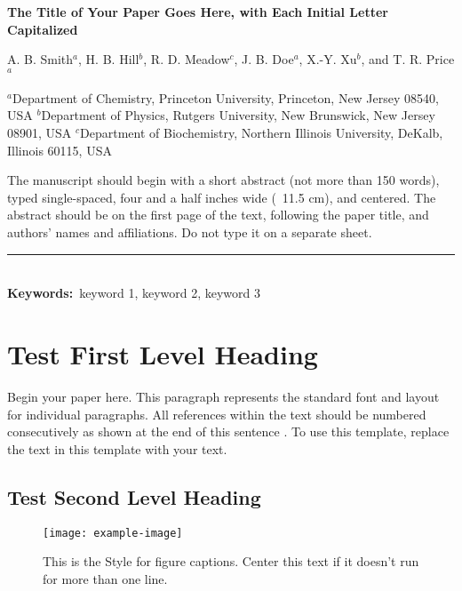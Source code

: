 \documentclass[twoside,onecolumn,12pt]{article}
\newcommand\keywords{%
\noindent\rule{\wd\keywbox}{0.25pt}\\\textbf{Keywords:}\ }
\begin{document}
\begin{center}
\textbf{The Title of Your Paper Goes Here, with Each Initial Letter Capitalized}
\end{center}%
\begin{center}
A. B. Smith\textit{$^{a}$}, H. B. Hill\textit{$^{b}$}, R. D. Meadow\textit{$^{c}$}, J. B. Doe\textit{$^{a}$}, X.-Y. Xu\textit{$^{b}$}, and T. R. Price\textit{$^{a}$} %
\end{center}
\begin{center}
\small\textit{$^{a}$}Department of Chemistry, Princeton University, Princeton, New Jersey 08540, USA \newline
\small\textit{$^{b}$}Department of Physics, Rutgers University, New Brunswick, New Jersey 08901, USA \newline
\small\textit{$^{c}$}Department of Biochemistry, Northern Illinois University, DeKalb, Illinois 60115, USA
\end{center}

\begin{center}
\parbox{11.5cm}{The manuscript should begin with a short abstract (not more than 150 words), typed single-spaced, four and a half inches wide (~11.5 cm), and centered. The abstract should be on the first page of the text, following the paper title, and authors’ names and affiliations. Do not type it on a separate sheet.}
\end{center}
\keywords keyword 1, keyword 2, keyword 3

\section{Test First Level Heading} %
\noindent Begin your paper here. This paragraph represents the standard font and layout for individual paragraphs. All references within the text should be numbered consecutively as shown at the end of this sentence \autocite{andrews1991}. To use this template, replace the text in this template with your text. 

\subsection{Test Second Level Heading}
\lipsum[1-1]

\begin{figure}[htb]
    \centering
    \texttt{[image: example-image]}
    \caption{This is the Style for figure captions. Center this text if it doesn't run for more than one line.}
\end{figure}
\end{document}

